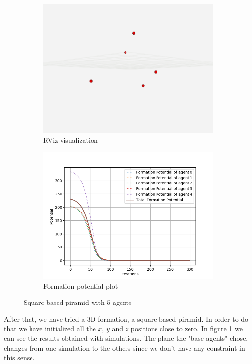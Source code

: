 \documentclass[a4paper,11pt,oneside]{book}
\begin{document}
\begin{figure}
\centering
	\begin{subfigure}{0.49\textwidth}	
	\includegraphics[scale=0.24]{piramid_rviz}
	\caption{RViz visualization}
	\end{subfigure}
\hfill
	\begin{subfigure}{0.49\textwidth}	
	\includegraphics[scale=0.42]{Formation_potential_piramid}
	\caption{Formation potential plot}
	\end{subfigure}
\caption{Square-based piramid with $5$ agents}
\label{Piramid}
\end{figure}

After that, we have tried a 3D-formation, a square-based piramid. In order to do that we have initialized all the $x$, $y$ and $z$ positions close to zero. In figure \ref{Piramid} we can see the results obtained with simulations. The plane the "base-agents" chose, changes from one simulation to the others since we don't have any constraint in this sense.
\end{document}
